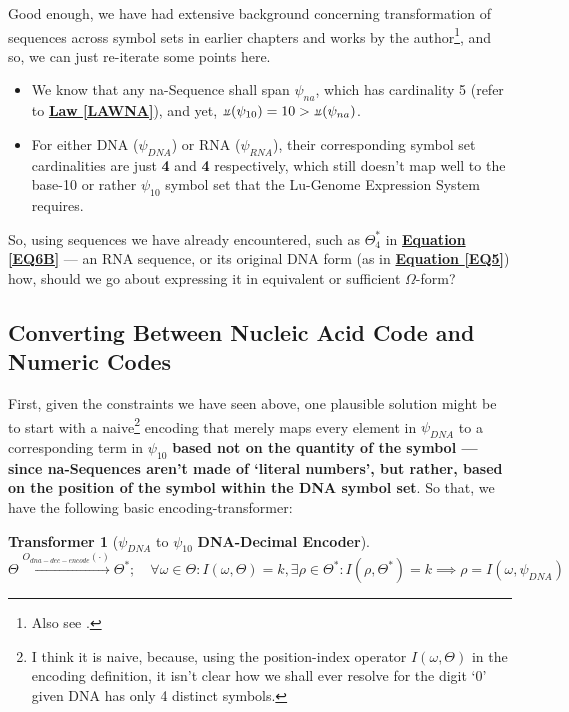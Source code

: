 \documentclass[a4paper, 18pt]{book} %
\newtheorem{transf}{Transformer}
\newcommand{\invpi}{\rotatebox[origin=c]{180}{$\pi$}}
\begin{document}
Good enough, we have had extensive background concerning transformation of sequences across symbol sets in earlier chapters and works by the author\cite{base36paper}\cite{lnspaper}\footnote{Also see \cite{bosse2025repeating}.}, and so, we can just re-iterate some points here.

\begin{itemize}
\item We know that any na-Sequence shall span $\psi_{na}$, which has cardinality 5 (refer to \textbf{\hyperref[LAWNA]{Law \ref{LAWNA}}}), and yet, $\invpi(\psi_{10}) = 10 > \invpi(\psi_{na})$.
\item For either DNA ($\psi_{DNA}$) or RNA ($\psi_{RNA}$), their corresponding symbol set cardinalities are just \textbf{4} and \textbf{4} respectively, which still doesn't map well to the base-10 or rather $\psi_{10}$ symbol set that the Lu-Genome Expression System requires.
\end{itemize}

So, using sequences we have already encountered, such as $\Theta_4^*$ in \textbf{\hyperref[EQ6B]{Equation \ref{EQ6B}}} --- an RNA sequence, or its original DNA form (as in \textbf{\hyperref[EQ5]{Equation \ref{EQ5}}}) how, should we go about expressing it in equivalent or sufficient $\Omega$-form?

\subsection{Converting Between Nucleic Acid Code and Numeric Codes}

First, given the constraints we have seen above, one plausible solution might be to start with a naive\footnote{I think it is naive, because, using the position-index operator $I(\omega,\Theta)$ in the encoding definition, it isn't clear how we shall ever resolve for the digit `0' given DNA has only 4 distinct symbols.} encoding that merely maps every element in $\psi_{DNA}$ to a corresponding term in $\psi_{10}$ \textbf{based not on the quantity of the symbol --- since na-Sequences aren't made of `literal numbers', but rather, based on the position of the symbol within the DNA symbol set}. So that, we have the following basic encoding-transformer:\\


\begin{transf}[$\psi_{DNA}$ to $\psi_{10}$ \textbf{DNA-Decimal Encoder}]
\label{TRANSFDNADECEN}
$ $\\
$\Theta \xrightarrow{O_{dna-dec-encode}(\cdot)} \Theta^*; \quad \forall \omega \in \Theta: I(\omega,\Theta) = k, \exists \rho \in \Theta^*: I(\rho,\Theta^*) = k \implies \rho = I(\omega,\psi_{DNA})$\\
\end{transf}
\end{document}

